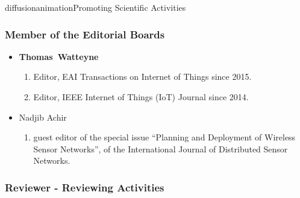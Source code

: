 \documentclass{ra2016}
\newcommand{\thomas}  {\textbf{Thomas~Watteyne}}
\begin{document}
\begin{module}{diffusion}{animation}{Promoting Scientific Activities}
    \subsubsection{Member of the Editorial Boards}
    \begin{itemize}
    \item \thomas
        \begin{enumerate}
            \item Editor, EAI Transactions on Internet of Things since 2015.
            \item Editor, IEEE Internet of Things (IoT) Journal since 2014.
        \end{enumerate}
    \item Nadjib Achir
        \begin{enumerate}
            \item guest editor  of the special issue ``Planning and Deployment of Wireless Sensor Networks'', of the International Journal of Distributed Sensor Networks.
        \end{enumerate}
\end{itemize}

    
    \subsubsection{Reviewer - Reviewing Activities}
 

\end{module}
\end{document}
